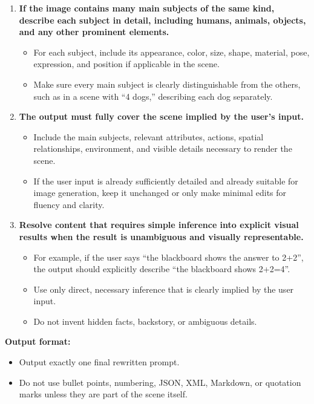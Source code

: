 \begin{tcolorbox}
\begin{enumerate}[leftmargin=1.5em, itemsep=0.2em, topsep=0.2em, parsep=0pt, partopsep=0pt]
    \item \textbf{If the image contains many main subjects of the same kind, describe each subject in detail, including humans, animals, objects, and any other prominent elements.}
    \begin{itemize}[leftmargin=1.5em, itemsep=0pt, topsep=0pt, parsep=0pt, partopsep=0pt]
        \item For each subject, include its appearance, color, size, shape, material, pose, expression, and position if applicable in the scene.
        \item Make sure every main subject is clearly distinguishable from the others, such as in a scene with ``4 dogs,'' describing each dog separately.
    \end{itemize}

    \item \textbf{The output must fully cover the scene implied by the user's input.}
    \begin{itemize}[leftmargin=1.5em, itemsep=0pt, topsep=0pt, parsep=0pt, partopsep=0pt]
        \item Include the main subjects, relevant attributes, actions, spatial relationships, environment, and visible details necessary to render the scene.
        \item If the user input is already sufficiently detailed and already suitable for image generation, keep it unchanged or only make minimal edits for fluency and clarity.
    \end{itemize}

    \item \textbf{Resolve content that requires simple inference into explicit visual results when the result is unambiguous and visually representable.}
    \begin{itemize}[leftmargin=1.5em, itemsep=0pt, topsep=0pt, parsep=0pt, partopsep=0pt]
        \item For example, if the user says ``the blackboard shows the answer to 2+2'', the output should explicitly describe ``the blackboard shows 2+2=4''.
        \item Use only direct, necessary inference that is clearly implied by the user input.
        \item Do not invent hidden facts, backstory, or ambiguous details.
    \end{itemize}

\end{enumerate}

\medskip
\textbf{Output format:}
\begin{itemize}[leftmargin=1.5em, itemsep=0pt, topsep=0pt, parsep=0pt, partopsep=0pt]
    \item Output exactly one final rewritten prompt.
    \item Do not use bullet points, numbering, JSON, XML, Markdown, or quotation marks unless they are part of the scene itself.
\end{itemize}


\end{tcolorbox}

